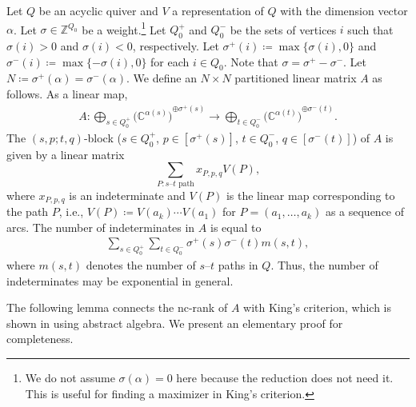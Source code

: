 \documentclass[a4paper,11pt]{article}
\numberwithin{equation}{section}
\newcommand{\C}{\mathbb{C}}
\newcommand{\Z}{\mathbb{Z}}
\begin{document}
Let $Q$ be an acyclic quiver and $V$ a representation of $Q$ with the dimension vector $\alpha$.
Let $\sigma \in \Z^{Q_0}$ be a weight.\footnote{We do not assume $\sigma(\alpha) = 0$ here because the reduction does not need it. This is useful for finding a maximizer in King's criterion.}
Let $Q_0^+$ and $Q_0^-$ be the sets of vertices $i$ such that $\sigma(i) > 0$ and $\sigma(i) < 0$, respectively.
Let $\sigma^+(i) \coloneqq \max\{\sigma(i), 0\}$ and $\sigma^-(i) \coloneqq \max\{-\sigma(i), 0\}$ for each $i \in Q_0$.
Note that $\sigma = \sigma^+ - \sigma^-$.
Let $N \coloneqq \sigma^+(\alpha) = \sigma^-(\alpha)$.
We define an $N \times N$ partitioned linear matrix $A$ as follows.
As a linear map, 
\begin{align}\label{eq:A-Derksen2017}
    A: \bigoplus_{s \in Q_0^+} {\bigl(\C^{\alpha(s)}\bigr)}^{\oplus \sigma^+(s)} \to \bigoplus_{t \in Q_0^-} {\bigl(\C^{\alpha(t)}\bigr)}^{\oplus \sigma^-(t)}.
\end{align}
The $(s,p;t,q)$-block ($s \in Q_0^+$, $p \in [\sigma^+(s)]$, $t \in Q_0^-$, $q \in [\sigma^-(t)]$) of $A$ is given by a linear matrix
\[
    \sum_{P: \text{$s$--$t$ path}} x_{P,p,q} V(P),
\]
where $x_{P,p,q}$ is an indeterminate and $V(P)$ is the linear map corresponding to the path $P$, i.e., $V(P) \coloneqq V(a_k) \cdots V(a_1)$ for $P = (a_1, \dots, a_k)$ as a sequence of arcs.
The number of indeterminates in $A$ is equal to 
\begin{align}
    \sum_{s \in Q_0^+} \sum_{t \in Q_0^-} \sigma^+(s)\sigma^-(t) m(s,t),
\end{align}
where $m(s,t)$ denotes the number of $s$--$t$ paths in $Q$.
Thus, the number of indeterminates may be exponential in general.

The following lemma connects the nc-rank of $A$ with King's criterion, which is shown in \citep[Theorem~3.3]{Huszar2021} using abstract algebra.
We present an elementary proof for completeness. 
\end{document}
